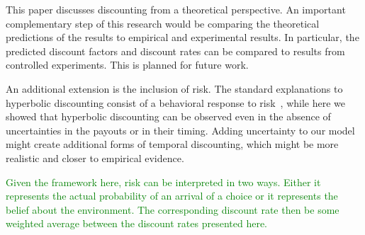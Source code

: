 \documentclass[11pt]{article}
\numberwithin{equation}{section}
\begin{document}
This paper discusses discounting from a theoretical perspective. An important complementary step of this research would be comparing the theoretical predictions of the results to empirical and experimental results. In particular, the predicted discount factors and discount rates can be compared to results from controlled experiments. This is planned for future work.

An additional extension is the inclusion of risk. The standard explanations to hyperbolic discounting consist of a behavioral response to risk~\citep{sozou1998hyperbolic,dasgupta2005uncertainty}, while here we showed that hyperbolic discounting can be observed even in the absence of uncertainties in the payouts or in their timing. Adding uncertainty to our model might create additional forms of temporal discounting, which might be more realistic and closer to empirical evidence.

\textcolor{green}{Given the framework here, risk can be interpreted in two ways. Either it represents the actual probability of an arrival of a choice or it represents the belief about the environment. The corresponding discount rate then be some weighted average between the discount rates presented here. }


\end{document}
